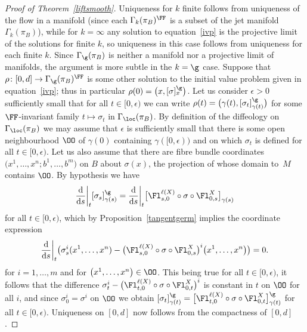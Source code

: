 \begin{proof}[Proof of Theorem~\ref{liftsmooth}]
Uniqueness for $k$ finite follows from uniqueness of the flow in a manifold (since each $\Gamma_{k}(\pi_{B})^{\FF}$ is a subset of the jet manifold $\Gamma_{k}(\pi_{B})$), while for $k=\infty$ any solution to equation~\eqref{ivp} is the projective limit of the solutions for finite $k$, so uniqueness in this case follows from uniqueness for each finite $k$. Since $\Gamma_{\g}(\pi_{B})$ is neither a manifold nor a projective limit of manifolds, the argument is more subtle in the $k=\g$ case. Suppose that $\rho\colon [0,d]\rightarrow\Gamma_{\g}(\pi_{B})^{\FF}$ is some other solution to the initial value problem given in equation~\eqref{ivp}; thus in particular $\rho(0) = \big(x,[\sigma]^{\g}_{x}\big)$. Let us consider $\epsilon>0$ sufficiently small that for all $t\in[0,\epsilon)$ we can write $\rho(t) = \big(\gamma(t),[\sigma_{t}]^{\g}_{\gamma(t)}\big)$ for some $\FF$-invariant family $t\mapsto\sigma_{t}$ in $\Gamma_{\loc}(\pi_{B})$. By definition of the diffeology on $\Gamma_{\loc}(\pi_{B})$ we may assume that $\epsilon$ is sufficiently small that there is some open neighbourhood $\OO$ of $\gamma(0)$ containing $\gamma([0,\epsilon))$ and on which $\sigma_{t}$ is defined for all $t\in[0,\epsilon)$. Let us also assume that there are fibre bundle coordinates $\big(x^{1},\dots,x^{n};b^{1},\dots,b^{m}\big)$ on $B$ about $\sigma(x)$, the projection of whose domain to~$M$ contains $\OO$. By hypothesis we have\vspace{-1ex}
\begin{gather*}
\frac{\rm d}{{\rm d}s}\bigg|_{t}[\sigma_{s}]^{\g}_{\gamma(s)} = \frac{\rm d}{{\rm d}s}\bigg|_{t}\big[\Fl^{\ell(X)}_{s,0}\circ\sigma\circ\Fl^{X}_{0,s}\big]_{\gamma(s)}
\end{gather*}
for all $t\in[0,\epsilon)$, which by Proposition~\ref{tangentgerm} implies the coordinate expression\vspace{-1ex}
\begin{gather*}
\frac{\rm d}{{\rm d}s}\bigg|_{t}\big(\sigma^{i}_{s}(x^{1},\dots,x^{n})- \big(\Fl^{\ell(X)}_{s,0}\circ\sigma\circ\Fl^{X}_{0,s}\big)^{i}\big(x^{1},\dots,x^{n}\big)\big) = 0.
\end{gather*}
for $i=1,\dots,m$ and for $\big(x^{1},\dots,x^{n}\big)\in\OO$. This being true for all $t\in[0,\epsilon)$, it follows that the difference $\sigma^{i}_{t}-\big(\Fl^{\ell(X)}_{t,0}\circ\sigma\circ\Fl^{X}_{0,t}\big)^{i}$ is constant in $t$ on $\OO$ for all $i$, and since $\sigma^{i}_{0} = \sigma^{i}$ on $\OO$ we obtain $[\sigma_{t}]^{\g}_{\gamma(t)} = \big[\Fl^{\ell(X)}_{t,0}\circ\sigma\circ\Fl^{X}_{0,t}\big]^{\g}_{\gamma(t)}$ for all $t\in[0,\epsilon)$. Uniqueness on $[0,d]$ now follows from the compactness of $[0,d]$.



\end{proof}
